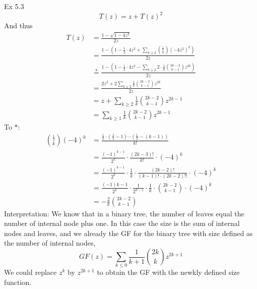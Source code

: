 \documentclass{article}
\begin{document}
    
Ex 5.3\\
\[
    T(z) = z + T(z)^2
    \]
And thus
\begin{align*}
    T(z) &= \frac{1 - \sqrt{1 - 4z^2}}{2z}\\
        &= \frac{1 - ( 1 - \frac{1}{2}\cdot 4z^2 + \sum_{k\geq 2} \binom{\frac{1}{2}}{k}(-4z^2)^k)}{2z}\\
        &\stackrel{*}{=} \frac{1 - (1 - \frac{1}{2}\cdot4z^2 - \sum_{k \geq 2} 2 \cdot \frac{1}{k}\binom{2k-2}{k-1}z^{2k})}{2z}\\
        &= \frac{2z^2 + 2 \sum_{k\geq2}\frac{1}{k}\binom{2k-2}{k-1}z^{2k}}{2z}\\
        &= z + \sum_{k\geq2}\frac{1}{k}\binom{2k-2}{k-1}z^{2k - 1}\\
        &= \sum_{k \geq 1}\frac{1}{k}\binom{2k-2}{k-1}z^{2k-1}
\end{align*}
To $*$:
\begin{align*}
    \binom{\frac{1}{2}}{k} (-4)^k &= \frac{\frac{1}{2} \cdot (\frac{1}{2} - 1) \cdots (\frac{1}{2} - (k - 1))}{k!}\\
    &= \frac{(-1)^{k-1}}{2^k} \cdot \frac{(2k-3)!}{k!} \cdot (-4)^k\\
    &= \frac{(-1)^{k-1}}{2^k} \cdot \frac{1}{k} \cdot \frac{(2k-2)!}{(k-1)! \cdot (2k-2)!!} \cdot (-4)^k\\
    &= \frac{(-1){k-1}}{2^k}\cdot \frac{1}{2^{k-1}}\cdot \frac{1}{k}\cdot \binom{2k-2}{k-1}\cdot (-4)^k\\
    &= -\frac{2}{k} \binom{2k-2}{k-1}
\end{align*}
Interpretation:
We know that in a binary tree, the number of leaves equal the number of internal node plus one. In this case
the size is the sum of internal nodes and leaves, and we already the GF for the binary tree with size defined as the number of internal
nodes,
\[
    GF(z) = \sum_{k \leq 0} \frac{1}{k+1}\binom{2k}{k}z^{2k+1}\]
We could replace $z^k$ by $z^{2k+1}$ to obtain the GF with the newkly defined size function.
\end{document}
